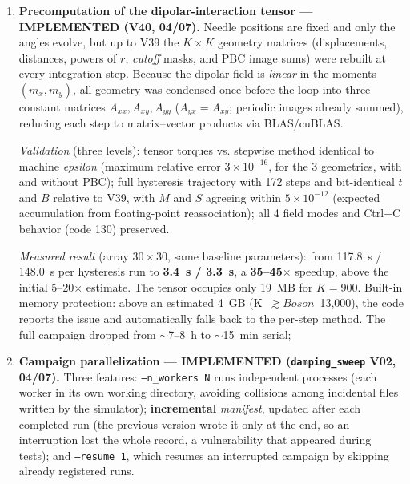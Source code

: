 \documentclass[11pt,a4paper]{article}
\newcommand{\code}[1]{\texttt{#1}}
\begin{document}
\begin{enumerate}
\item \textbf{Precomputation of the dipolar-interaction tensor --- IMPLEMENTED (V40, 04/07).} Needle positions are fixed and only the angles evolve, but up to V39 the $K \times K$ geometry matrices (displacements, distances, powers of $r$, \emph{cutoff} masks, and PBC image sums) were rebuilt at every integration step. Because the dipolar field is \emph{linear} in the moments $(m_x, m_y)$, all geometry was condensed once before the loop into three constant matrices $A_{xx}, A_{xy}, A_{yy}$ ($A_{yx} = A_{xy}$; periodic images already summed), reducing each step to matrix--vector products via BLAS/cuBLAS.

\emph{Validation} (three levels): tensor torques vs. stepwise method identical to machine \emph{epsilon} (maximum relative error $3 \times 10^{-16}$, for the 3 geometries, with and without PBC); full hysteresis trajectory with 172 steps and bit-identical $t$ and $B$ relative to V39, with $M$ and $S$ agreeing within $5 \times 10^{-12}$ (expected accumulation from floating-point reassociation); all 4 field modes and \mbox{Ctrl+C} behavior (code 130) preserved.

\emph{Measured result} (array $30\times30$, same baseline parameters): from 117.8~s / 148.0~s per hysteresis run to \textbf{3.4~s / 3.3~s}, a \textbf{35--45$\times$} speedup, above the initial 5--20$\times$ estimate. The tensor occupies only 19~MB for $K = 900$. Built-in memory protection: above an estimated 4~GB (K~$\gtrsim Boson$~13,000), the code reports the issue and automatically falls back to the per-step method. The full campaign dropped from $\sim$7--8~h to $\sim$15~min serial;
\item \textbf{Campaign parallelization --- IMPLEMENTED (\code{damping\_sweep} V02, 04/07).} Three features: \code{--n\_workers~N} runs independent processes (each worker in its own working directory, avoiding collisions among incidental files written by the simulator); \textbf{incremental} \emph{manifest}, updated after each completed run (the previous version wrote it only at the end, so an interruption lost the whole record, a vulnerability that appeared during tests); and \code{--resume~1}, which resumes an interrupted campaign by skipping already registered runs.


\end{enumerate}
\end{document}
